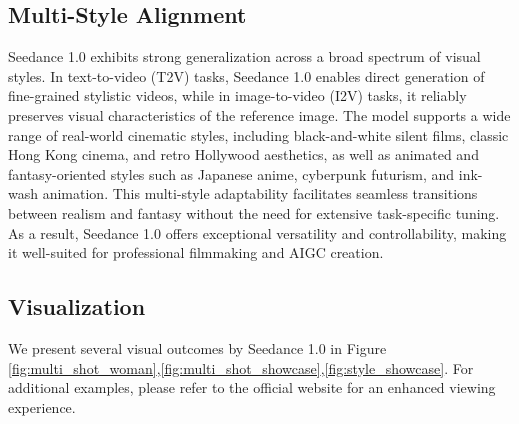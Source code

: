 \subsection{Multi-Style Alignment}
Seedance 1.0 exhibits strong generalization across a broad spectrum of visual styles. In text-to-video (T2V) tasks, Seedance 1.0 enables direct generation of fine-grained stylistic videos, while in image-to-video (I2V) tasks, it reliably preserves visual characteristics of the reference image. The model supports a wide range of real-world cinematic styles, including black-and-white silent films, classic Hong Kong cinema, and retro Hollywood aesthetics, as well as animated and fantasy-oriented styles such as Japanese anime, cyberpunk futurism, and ink-wash animation. This multi-style adaptability facilitates seamless transitions between realism and fantasy without the need for extensive task-specific tuning. As a result, Seedance 1.0 offers exceptional versatility and controllability, making it well-suited for professional filmmaking and AIGC creation.



\subsection{Visualization}
We present several visual outcomes by Seedance 1.0 in Figure \ref{fig:multi_shot_woman},\ref{fig:multi_shot_showcase},\ref{fig:style_showcase}.
For additional examples, please refer to the official website for an enhanced viewing experience.






